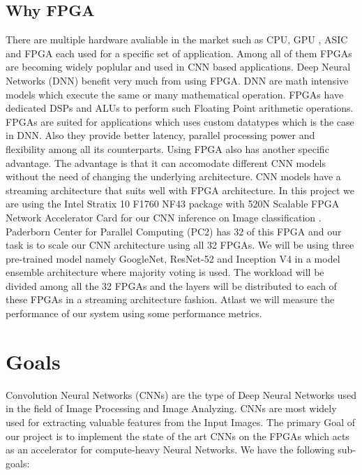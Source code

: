 \documentclass[titlepage]{report}
\begin{document}
\section{Why FPGA}
There are multiple hardware avaliable in the market such as CPU, GPU , ASIC and FPGA each used for a specific set of application. Among all of them FPGAs are becoming widely poplular and used in CNN based applications. Deep Neural Networks (DNN) benefit very much from using FPGA. DNN are math intensive models which execute the same or many mathematical operation. FPGAs have dedicated DSPs and ALUs to perform such Floating Point arithmetic operations. FPGAs are suited for applications which uses custom datatypes which is the case in DNN. Also they provide better latency, parallel processing power and flexibility among all its counterparts. Using FPGA also has another specific advantage. The advantage is that it can accomodate different CNN models without the need of changing the underlying architecture. CNN models have a streaming architecture that suits well with FPGA architecture.
In this project we are using the Intel Stratix 10 F1760 NF43 package with 520N Scalable FPGA Network Accelerator Card for our CNN inference on Image classification . Paderborn Center for Parallel Computing (PC2) has 32 of this FPGA and our task is to scale our CNN architecture using all 32 FPGAs. We will be using three pre-trained model namely GoogleNet, ResNet-52 and Inception V4 in a model ensemble architecture where majority voting is used. The workload will be divided among all the 32 FPGAs and the layers will be distributed to each of these FPGAs in a streaming architecture fashion. Atlast we will measure the performance of our system using some performance metrics.





\chapter{Goals}
Convolution Neural Networks (CNNs) are the type of Deep Neural Networks used in the field of Image Processing and Image Analyzing.
CNNs are most widely used for extracting valuable features from the Input Images.
The primary Goal of our project is to implement the state of the art CNNs on the FPGAs which acts as an accelerator for compute-heavy Neural Networks. \linebreak 
We have the following sub-goals:
\end{document}

